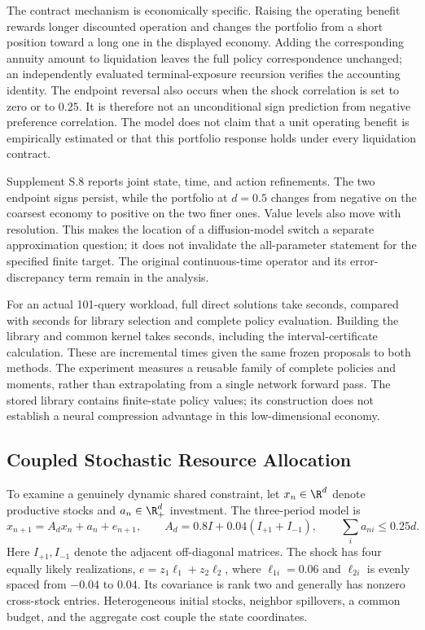 The contract mechanism is economically specific. Raising the operating benefit rewards longer discounted operation and changes the portfolio from a short position toward a long one in the displayed economy. Adding the corresponding annuity amount to liquidation leaves the full policy correspondence unchanged; an independently evaluated terminal-exposure recursion verifies the accounting identity. The endpoint reversal also occurs when the shock correlation is set to zero or to $0.25$. It is therefore not an unconditional sign prediction from negative preference correlation. The model does not claim that a unit operating benefit is empirically estimated or that this portfolio response holds under every liquidation contract.

Supplement S.8 reports joint state, time, and action refinements. The two endpoint signs persist, while the portfolio at $d=0.5$ changes from negative on the coarsest economy to positive on the two finer ones. Value levels also move with resolution. This makes the location of a diffusion-model switch a separate approximation question; it does not invalidate the all-parameter statement for the specified finite target. The original continuous-time operator and its error-discrepancy term remain in the analysis.

For an actual 101-query workload, full direct solutions take \NBOContractDirect{} seconds, compared with \NBOContractReuse{} seconds for library selection and complete policy evaluation. Building the library and common kernel takes \NBOContractPreparation{} seconds, including the interval-certificate calculation. These are incremental times given the same frozen proposals to both methods. The experiment measures a reusable family of complete policies and moments, rather than extrapolating from a single network forward pass. The stored library contains finite-state policy values; its construction does not establish a neural compression advantage in this low-dimensional economy.

\subsection{Coupled Stochastic Resource Allocation}
\label{sec:resource}
To examine a genuinely dynamic shared constraint, let $x_n\in\R^d$ denote productive stocks and $a_n\in\R_+^d$ investment. The three-period model is
\begin{equation}
 x_{n+1}=A_dx_n+a_n+e_{n+1},\qquad
 A_d=0.8I+0.04(I_{+1}+I_{-1}),\qquad
 \sum_i a_{ni}\leq0.25d.
 \label{eq:resource_state}
\end{equation}
Here $I_{+1},I_{-1}$ denote the adjacent off-diagonal matrices. The shock has four equally likely realizations,
$e=z_1\ell_1+z_2\ell_2$, where $\ell_{1i}=0.06$ and $\ell_{2i}$ is evenly spaced from $-0.04$ to $0.04$. Its covariance is rank two and generally has nonzero cross-stock entries. Heterogeneous initial stocks, neighbor spillovers, a common budget, and the aggregate cost couple the state coordinates.

